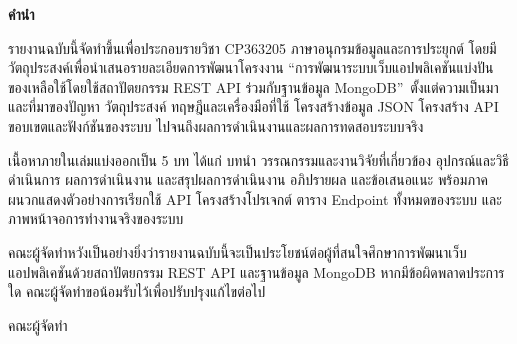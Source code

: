 \documentclass[12pt,a4paper]{report}
\begin{document}
\clearpage
\setcounter{page}{1}
\pagestyle{front}

\begin{center}
  {\bfseries\large คำนำ}
\end{center}

รายงานฉบับนี้จัดทำขึ้นเพื่อประกอบรายวิชา CP363205 ภาษาอนุกรมข้อมูลและการประยุกต์ โดยมีวัตถุประสงค์เพื่อนำเสนอรายละเอียดการพัฒนาโครงงาน \textquotedblleft การพัฒนาระบบเว็บแอปพลิเคชันแบ่งปันของเหลือใช้โดยใช้สถาปัตยกรรม REST API ร่วมกับฐานข้อมูล MongoDB\textquotedblright\ ตั้งแต่ความเป็นมาและที่มาของปัญหา วัตถุประสงค์ ทฤษฎีและเครื่องมือที่ใช้ โครงสร้างข้อมูล JSON โครงสร้าง API ขอบเขตและฟังก์ชันของระบบ ไปจนถึงผลการดำเนินงานและผลการทดสอบระบบจริง

\vspace{0.6em}

เนื้อหาภายในเล่มแบ่งออกเป็น 5 บท ได้แก่ บทนำ วรรณกรรมและงานวิจัยที่เกี่ยวข้อง อุปกรณ์และวิธีดำเนินการ ผลการดำเนินงาน และสรุปผลการดำเนินงาน อภิปรายผล และข้อเสนอแนะ พร้อมภาคผนวกแสดงตัวอย่างการเรียกใช้ API โครงสร้างโปรเจกต์ ตาราง Endpoint ทั้งหมดของระบบ และภาพหน้าจอการทำงานจริงของระบบ

\vspace{0.6em}

คณะผู้จัดทำหวังเป็นอย่างยิ่งว่ารายงานฉบับนี้จะเป็นประโยชน์ต่อผู้ที่สนใจศึกษาการพัฒนาเว็บแอปพลิเคชันด้วยสถาปัตยกรรม REST API และฐานข้อมูล MongoDB หากมีข้อผิดพลาดประการใด คณะผู้จัดทำขอน้อมรับไว้เพื่อปรับปรุงแก้ไขต่อไป

\vspace{1.2em}
\begin{flushright}
คณะผู้จัดทำ
\end{flushright}

\newpage

\tableofcontents
\end{document}
